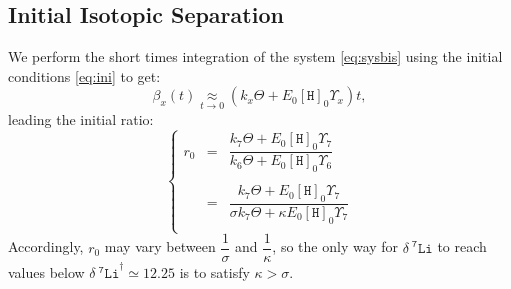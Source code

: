 \documentclass[aps,onecolumn,11pt]{revtex4}
\newcommand{\mychem}[1]{\mathtt{#1}}
\newcommand{\myconc}[1]{\left\lbrack{#1}\right\rbrack}
\newcommand{\spLi}[1]{{~^{\mychem{#1}}\mychem{Li}}}
\newcommand{\spproton}{\mychem{H}}
\newcommand{\proton}{\myconc{\spproton}}
\newcommand{\deltaLi}{ {\delta\!\!\!\spLi{7}} }
\newcommand{\LiAll}{\Lambda}
\newcommand{\LiAllOut}{{\LiAll}_{\mathrm{out}}}
\newcommand{\ko}{\dagger}
\begin{document}
%
%

	
\subsection{Initial Isotopic Separation}
We perform the short times integration of the system \eqref{eq:sysbis} using the initial
conditions \eqref{eq:ini} to get:
\begin{equation}
\beta_x(t) \underset{t\to0}{\approx} \left(k_x \Theta + E_0 \proton_0 \Upsilon_x\right) t,
\end{equation}
leading the initial ratio:
\begin{equation}
\label{eq:r0}
\left\lbrace
\begin{array}{rcl}
r_0 & = & \dfrac{k_7\Theta+E_0 \proton_0 \Upsilon_7}{k_6\Theta+E_0 \proton_0 \Upsilon_6}\\
	\\
    & = & \dfrac{k_7\Theta+E_0 \proton_0 \Upsilon_7}{ \sigma k_7\Theta+ \kappa E_0 \proton_0 \Upsilon_7}\\
\end{array}
\right.
\end{equation}
Accordingly, $r_0$ may vary between $\dfrac{1}{\sigma}$ and $\dfrac{1}{\kappa}$, so the only way for $\deltaLi$ to reach values
below $\deltaLi^\ko\simeq12.25$ is to satisfy $\kappa>\sigma$.
\end{document}

